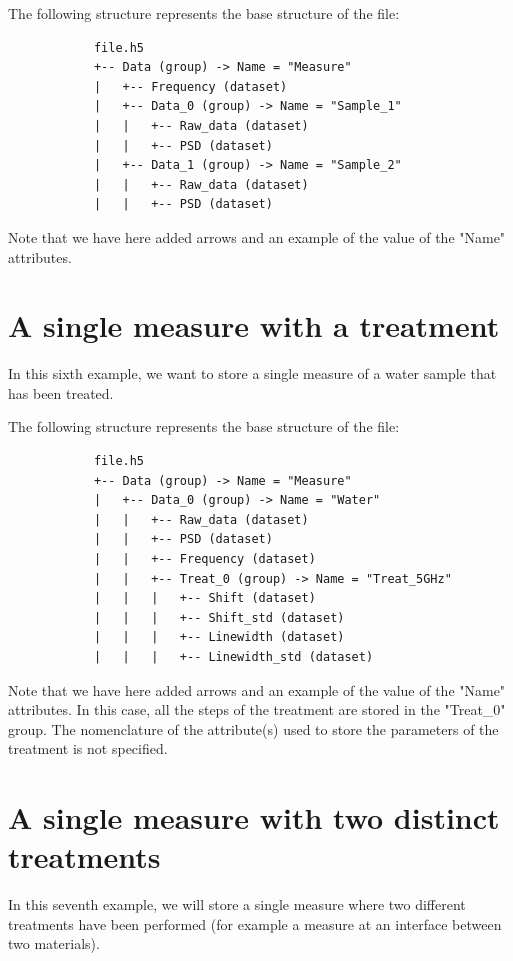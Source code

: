 \documentclass{book}
\begin{document}
        The following structure represents the base structure of the file:
        \begin{verbatim}
            file.h5
            +-- Data (group) -> Name = "Measure"
            |   +-- Frequency (dataset)
            |   +-- Data_0 (group) -> Name = "Sample_1"
            |   |   +-- Raw_data (dataset)
            |   |   +-- PSD (dataset)
            |   +-- Data_1 (group) -> Name = "Sample_2"
            |   |   +-- Raw_data (dataset)
            |   |   +-- PSD (dataset)
        \end{verbatim}
        Note that we have here added arrows and an example of the value of the "Name" attributes.

    \section{A single measure with a treatment}
        In this sixth example, we want to store a single measure of a water sample that has been treated.

        The following structure represents the base structure of the file:
        \begin{verbatim}
            file.h5
            +-- Data (group) -> Name = "Measure"
            |   +-- Data_0 (group) -> Name = "Water"
            |   |   +-- Raw_data (dataset)
            |   |   +-- PSD (dataset)
            |   |   +-- Frequency (dataset)
            |   |   +-- Treat_0 (group) -> Name = "Treat_5GHz"
            |   |   |   +-- Shift (dataset)
            |   |   |   +-- Shift_std (dataset)
            |   |   |   +-- Linewidth (dataset)
            |   |   |   +-- Linewidth_std (dataset)
        \end{verbatim}
        Note that we have here added arrows and an example of the value of the "Name" attributes.
        In this case, all the steps of the treatment are stored in the "Treat\_0" group. The nomenclature of the attribute(s) used to store the parameters of the treatment is not specified.
    
    \section{A single measure with two distinct treatments}
        In this seventh example, we will store a single measure where two different treatments have been performed (for example a measure at an interface between two materials).
\end{document}
